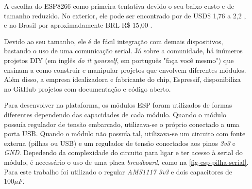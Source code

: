 \begin{table}[htb]
\end{table}


A escolha do ESP8266 como primeira tentativa devido o seu baixo custo e de
tamanho reduzido. No exterior, ele pode ser encontrado por de USD\$ 1,76 a 2,2
\cite{AlibabaESP}, e no Brasil por aproximadamente BRL R\$ 15,00 \cite{mercadolivreEsp}.

Devido ao seu tamanho, ele é de fácil integração com demais dispositivos,
bastando o uso de uma comunicação serial. Já sobre a comunidade, há inúmeros
projetos DIY (em inglês \emph{do it yourself}, em português "faça você mesmo")
que ensinam a como construir e manipular projetos que envolvem diferentes
módulos. Além disso, a empresa  idealizadora e fabricante do chip, Espressif,
disponibiliza no GitHub projetos com documentação e código aberto.

Para desenvolver na plataforma, os módulos ESP foram utilizados de formas
diferentes dependendo das capacidades de cada módulo. Quando o módulo possuía
regulador de tensão embarcado, utilizava-se o próprio conectado a uma porta USB.
Quando o módulo não possuía tal, utilizava-se um circuito com fonte externa
(pilhas ou USB) e um regulador de tensão conectados aos pinos \emph{3v3} e
\emph{GND}. Depedendo da complexidade do circuito para ligar e ter acesso à
serial do módulo, é necessário o uso de uma placa \emph{breadboard}, como na
\autoref{fig-esp-pilha-serial}. Para este trabalho foi utilizado o regular
\emph{AMS1117 3v3} e dois capacitores de $100 \mu F$.

